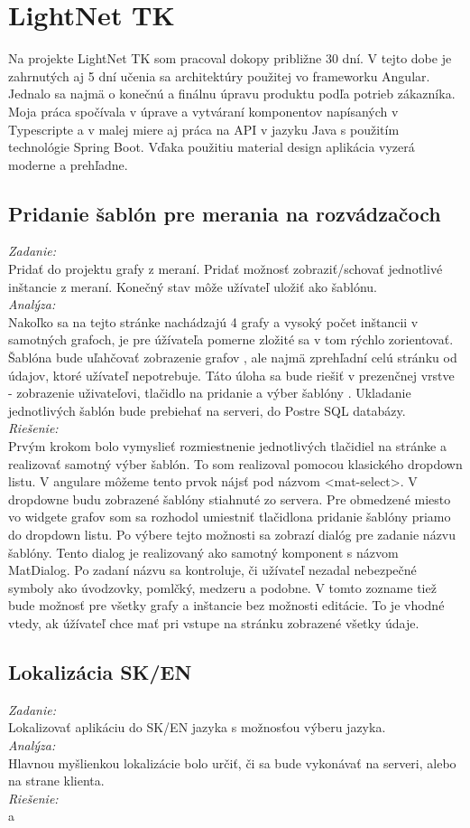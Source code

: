 \documentclass[11pt, oneside]{report}
\begin{document}
\section{LightNet TK}
Na projekte LightNet TK som pracoval dokopy približne  30 dní. V tejto dobe  je zahrnutých aj 5 dní učenia  sa architektúry použitej vo frameworku Angular. Jednalo sa najmä o konečnú a finálnu úpravu produktu podľa potrieb zákazníka. Moja práca spočívala v úprave a vytváraní  komponentov napísaných v Typescripte a v malej miere aj práca na API  v jazyku Java s použitím technológie Spring Boot. Vďaka použitiu material design aplikácia vyzerá moderne a prehľadne.
\subsection*{Pridanie šablón pre merania na rozvádzačoch }
\textit{Zadanie:}\\
Pridať do projektu grafy  z meraní. Pridať možnosť zobraziť/schovať jednotlivé inštancie  z meraní. Konečný stav môže užívateľ uložiť ako šablónu.
\\\textit{Analýza:}\\
 Nakoľko sa na tejto stránke nachádzajú 4 grafy  a vysoký počet inštancii v samotných grafoch, je pre úžívateľa pomerne zložité sa v tom rýchlo zorientovať. 
Šablóna bude uľahčovať zobrazenie grafov , ale najmä zprehľadní celú stránku od  údajov, ktoré užívateľ nepotrebuje. Táto úloha sa bude riešiť v prezenčnej vrstve - zobrazenie uživateľovi, tlačidlo na pridanie a výber šablóny . Ukladanie jednotlivých šablón bude prebiehať  na serveri, do Postre SQL databázy.
\\\textit{Riešenie:}\\
Prvým krokom bolo vymyslieť rozmiestnenie jednotlivých  tlačidiel na stránke a realizovať samotný výber šablón. To som realizoval pomocou klasického dropdown listu. V angulare môžeme tento  prvok nájsť pod názvom \textsf{<mat-select>}. V dropdowne budu zobrazené šablóny stiahnuté zo servera. Pre obmedzené miesto vo widgete grafov som sa rozhodol umiestniť tlačidlona pridanie šablóny priamo do dropdown listu. Po výbere tejto možnosti sa zobrazí dialóg pre zadanie názvu šablóny. Tento dialog je realizovaný ako samotný komponent s názvom  \textsf{MatDialog}. Po zadaní názvu sa kontroluje, či užívateľ nezadal nebezpečné symboly ako úvodzovky, pomlčký, medzeru  a podobne. V  tomto zozname tiež bude možnosť pre všetky grafy a inštancie bez možnosti editácie. To je vhodné vtedy, ak úžívateľ chce mať pri vstupe na stránku zobrazené všetky údaje. 
\subsection*{Lokalizácia SK/EN}
\textit{Zadanie:}\\
Lokalizovať aplikáciu do SK/EN jazyka s možnosťou výberu jazyka.
\\\textit{Analýza:}\\
Hlavnou myšlienkou lokalizácie bolo určiť, či sa bude vykonávať na serveri, alebo na strane klienta.
\\\textit{Riešenie:}\\
a
\end{document}
